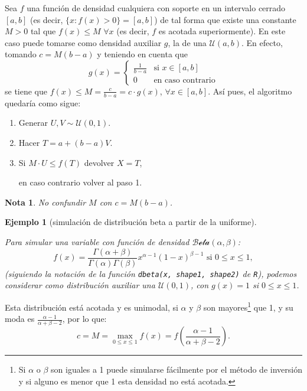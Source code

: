 \documentclass[
  10pt,
]{book}
\theoremstyle{break}
\newtheorem{example}{Ejemplo}[chapter]
\theoremstyle{nonumberplain}
\newtheorem{remark}{Nota}
\let\oldfootnote\footnote
\renewcommand\footnote[1]{\oldfootnote{\hspace{2mm}#1}}
\begin{document}
Sea \(f\) una función de densidad cualquiera con soporte en un intervalo cerrado \([a,b]\) (es decir, \(\{x : f(x) > 0\}=[a,b]\)) de tal forma que existe una constante \(M>0\) tal que \(f(x) \leq M\) \(\forall x\) (es decir, \(f\) es acotada superiormente).
En este caso puede tomarse como densidad auxiliar \(g\), la de una \(\mathcal{U}(a,b)\).
En efecto, tomando \(c = M\left( b-a\right)\) y teniendo en cuenta que
\[g(x) = \left\{
\begin{array}{ll}\frac{1}{b-a} & \text{si } x \in [a,b]\\
0 & \text{en caso contrario}
\end{array} \right.\]
se tiene que \(f(x) \leq M = \frac{c}{b-a}=c \cdot g(x)\),
\(\forall x \in [a,b]\).
Así pues, el algoritmo quedaría como sigue:

\begin{enumerate}
\def\labelenumi{\arabic{enumi}.}
\item
  Generar \(U,V\sim \mathcal{U}(0, 1)\).
\item
  Hacer \(T = a + \left( b-a \right) V\).
\item
  Si \(M \cdot U\leq f\left( T \right)\)
  devolver \(X = T\),

  en caso contrario volver al paso 1.
\end{enumerate}

\begin{remark}
No confundir \(M\) con \(c = M \left( b - a \right)\).
\end{remark}

\begin{example}[simulación de distribución beta a partir de la uniforme]
\protect\hypertarget{exm:dbeta-dunif-ar}{}\label{exm:dbeta-dunif-ar}

Para simular una variable con función de densidad \(\mathcal{Beta}(\alpha, \beta)\):
\[f(x)=\frac{\Gamma (\alpha + \beta )}{\Gamma (\alpha )\Gamma (\beta )}
x^{\alpha -1}(1-x)^{\beta -1}\text{ si }0 \leq x \leq 1,\]
(siguiendo la notación de la función \texttt{dbeta(x,\ shape1,\ shape2)} de \texttt{R}), podemos considerar como distribución auxiliar una \(\mathcal{U}(0,1)\),
con \(g(x) = 1\) si \(0 \leq x \leq 1\).
\end{example}

Esta distribución está acotada y es unimodal, si \(\alpha\) y \(\beta\) son mayores\footnote{Si \(\alpha\) o \(\beta\) son iguales a 1 puede simularse fácilmente por el método de inversión y si alguno es menor que 1 esta densidad no está acotada.} que 1, y su moda es \(\frac{\alpha - 1} {\alpha + \beta - 2}\), por lo que:
\[c = M = \max_{0 \leq x \leq 1}f(x) = f\left( \frac{\alpha - 1} {\alpha + \beta - 2} \right).\]
\end{document}
